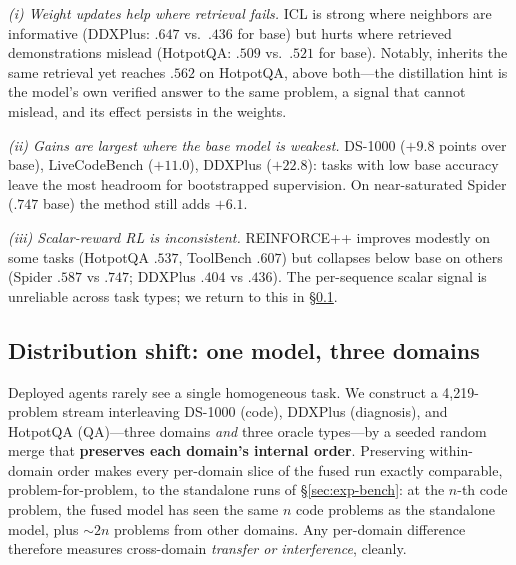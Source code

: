 \emph{(i) Weight updates help where retrieval fails.} ICL is strong where
neighbors are informative (DDXPlus: $.647$ vs.\ $.436$ for base) but hurts
where retrieved demonstrations mislead (HotpotQA: $.509$ vs.\ $.521$ for
base). Notably, \method{} inherits the same retrieval yet reaches $.562$ on
HotpotQA, above both---the distillation hint is the model's own verified answer
to the same problem, a signal that cannot mislead, and its effect persists in
the weights.

\emph{(ii) Gains are largest where the base model is weakest.} DS-1000
($+9.8$ points over base), LiveCodeBench ($+11.0$), DDXPlus ($+22.8$): tasks
with low base accuracy leave the most headroom for bootstrapped supervision.
On near-saturated Spider ($.747$ base) the method still adds $+6.1$.

\emph{(iii) Scalar-reward RL is inconsistent.} REINFORCE++ improves modestly on
some tasks (HotpotQA $.537$, ToolBench $.607$) but collapses below base on
others (Spider $.587$ vs $.747$; DDXPlus $.404$ vs $.436$). The per-sequence scalar signal is unreliable across task types; we return
to this in \S\ref{sec:exp-fused}.

\begin{table}[t]
\centering
\caption{Final cumulative accuracy on seven StreamBench tasks (native metric per
task; identical stream order and base model for all methods). Best in bold; our
method is best on all seven.}
\label{tab:bench}

\end{table}

\subsection{Distribution shift: one model, three domains}
\label{sec:exp-fused}

Deployed agents rarely see a single homogeneous task. We construct a
4{,}219-problem stream interleaving DS-1000 (code), DDXPlus (diagnosis), and
HotpotQA (QA)---three domains \emph{and} three oracle types---by a seeded random
merge that \textbf{preserves each domain's internal order}. Preserving
within-domain order makes every per-domain slice of the fused run exactly
comparable, problem-for-problem, to the standalone runs of
\S\ref{sec:exp-bench}: at the $n$-th code problem, the fused model has seen the
same $n$ code problems as the standalone model, plus ${\sim}2n$ problems from
other domains. Any per-domain difference therefore measures cross-domain
\emph{transfer or interference}, cleanly.

